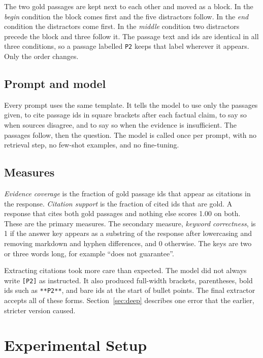 \documentclass[11pt,a4paper]{article}
\begin{document}
The two gold passages are kept next to each other and moved as a block.
In the \emph{begin} condition the block comes first and the five distractors follow.
In the \emph{end} condition the distractors come first.
In the \emph{middle} condition two distractors precede the block and three follow it.
The passage text and ids are identical in all three conditions, so a passage labelled \texttt{P2} keeps that label wherever it appears.
Only the order changes.

\subsection{Prompt and model}

Every prompt uses the same template.
It tells the model to use only the passages given, to cite passage ids in square brackets after each factual claim,
to say so when sources disagree, and to say so when the evidence is insufficient.
The passages follow, then the question.
The model is called once per prompt, with no retrieval step, no few-shot examples, and no fine-tuning.

\subsection{Measures}

\emph{Evidence coverage} is the fraction of gold passage ids that appear as citations in the response.
\emph{Citation support} is the fraction of cited ids that are gold.
A response that cites both gold passages and nothing else scores 1.00 on both.
These are the primary measures.
The secondary measure, \emph{keyword correctness}, is 1 if the answer key appears as a substring of the response
after lowercasing and removing markdown and hyphen differences, and 0 otherwise.
The keys are two or three words long, for example ``does not guarantee''.

Extracting citations took more care than expected.
The model did not always write \texttt{[P2]} as instructed.
It also produced full-width brackets, parentheses, bold ids such as \texttt{**P2**}, and bare ids at the start of bullet points.
The final extractor accepts all of these forms.
Section~\ref{sec:deep} describes one error that the earlier, stricter version caused.

\section{Experimental Setup}
\label{sec:setup}
\end{document}
